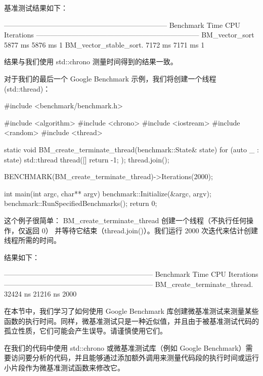 基准测试结果如下：

\begin{shell}
---------------------------------------------------------------------
Benchmark                       Time             CPU       Iterations
---------------------------------------------------------------------
BM_vector_sort               5877 ms         5876 ms                1
BM_vector_stable_sort.       7172 ms         7171 ms                1
\end{shell}

结果与我们使用 std::chrono 测量时间得到的结果一致。

对于我们的最后一个 Google Benchmark 示例，我们将创建一个线程 (std::thread)：

\begin{cpp}
#include <benchmark/benchmark.h>

#include <algorithm>
#include <chrono>
#include <iostream>
#include <random>
#include <thread>

static void BM_create_terminate_thread(benchmark::State& state) {
    for (auto _ : state) {
        std::thread thread([]{ return -1; });
        thread.join();
    }
}

BENCHMARK(BM_create_terminate_thread)->Iterations(2000);

int main(int argc, char** argv) {
    benchmark::Initialize(&argc, argv);
    benchmark::RunSpecifiedBenchmarks();
    return 0;
}
\end{cpp}

这个例子很简单： BM\_create\_terminate\_thread 创建一个线程（不执行任何操作，仅返回 0） 并等待它结束（thread.join()）。我们运行 2000 次迭代来估计创建线程所需的时间。

结果如下：

\begin{shell}
---------------------------------------------------------------
Benchmark                       Time        CPU      Iterations
---------------------------------------------------------------
BM_create_terminate_thread. 32424 ns   21216 ns            2000
\end{shell}

在本节中，我们学习了如何使用 Google Benchmark 库创建微基准测试来测量某些函数的执行时间。同样，微基准测试只是一种近似值，并且由于被基准测试代码的孤立性质，它们可能会产生误导。请谨慎使用它们。


在我们的代码中使用 std::chrono 或微基准测试库（例如 Google Benchmark）需要访问要分析的代码，并且能够通过添加额外调用来测量代码段的执行时间或运行小片段作为微基准测试函数来修改它。

